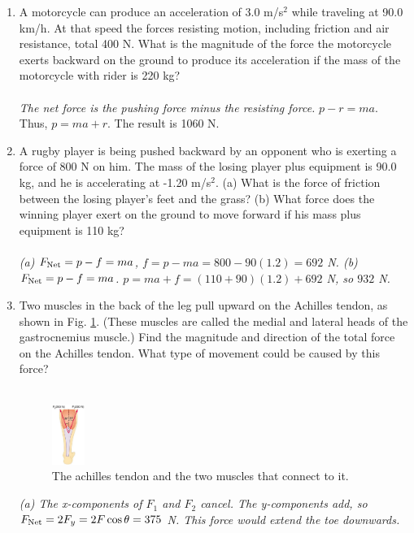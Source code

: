 \documentclass[10pt]{article}
\begin{document}
\begin{enumerate}
\item A motorcycle can produce an acceleration of 3.0 m/s$^2$ while traveling at 90.0 km/h. At that speed the forces resisting motion, including friction and air resistance, total 400 N.  What is the magnitude of the force the motorcycle exerts backward on the ground to produce its acceleration if the mass of the motorcycle with rider is 220 kg? \\ \\
\textit{The net force is the pushing force minus the resisting force.} $p - r = ma$.  Thus, $p = ma + r$.  The result is 1060 N.
\item A rugby player is being pushed backward by an opponent who is exerting a force of 800 N on him.  The mass of the losing player plus equipment is 90.0 kg, and he is accelerating at -1.20 m/s$^2$.  (a) What is the force of friction between the losing player’s feet and the grass? (b) What force does the winning player exert on the ground to move forward if his mass plus equipment is 110 kg? \\ \\
\textit{(a) $F_{\rm Net} = p - f = m a$, $f = p - ma = 800 - 90(1.2) = 692$ N. (b) $F_{\rm Net} = p-f = ma$.  $p = ma + f = (110+90)(1.2) + 692$ N, so $932$ N.}
\item Two muscles in the back of the leg pull upward on the Achilles tendon, as shown in Fig. \ref{fig:muscle}. (These muscles are called the medial and lateral heads of the gastrocnemius muscle.) Find the magnitude and direction of the total force on the Achilles tendon.  What type of movement could be caused by this force? \\ \\
\begin{figure}[hb]
\centering
\includegraphics[width=0.1\textwidth]{figures/muscle.png}
\caption{\label{fig:muscle} The achilles tendon and the two muscles that connect to it.}
\end{figure}
\textit{(a) The x-components of $F_1$ and $F_2$ cancel.  The y-components add, so $F_{\rm Net} = 2F_y = 2F\cos\theta = 375$ N. This force would extend the toe downwards.}
\end{enumerate}
\end{document}
